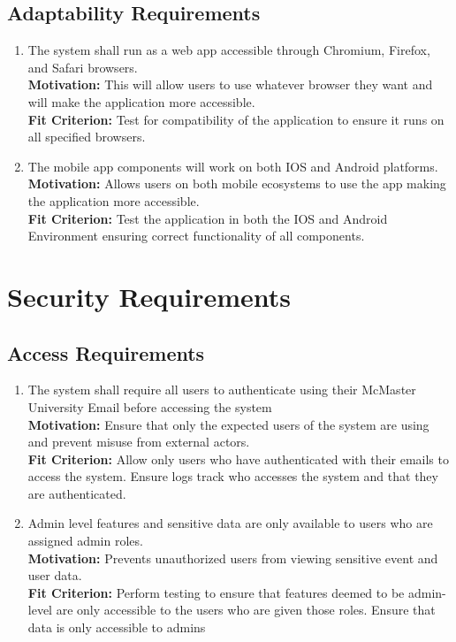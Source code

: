 \documentclass[12pt]{article}
\begin{document}
\subsection{Adaptability Requirements}
\begin{enumerate}[align=left,
  leftmargin=*,
  labelsep=1em,
  itemindent=0em,
  label=\bfseries AD-\arabic*:,
  ref=\bfseries AD-\arabic*]
  \item \label{MSAR1} The system shall run as a web app accessible through Chromium, Firefox, and Safari browsers. \\[2mm]
    {\bf Motivation:} This will allow users to use whatever browser they want and will make the application more accessible. \\
    {\bf Fit Criterion:} Test for compatibility of the application to ensure it runs on all specified browsers.
  \item \label{MSAR2} The mobile app components will work on both IOS and Android platforms. \\[2mm]
    {\bf Motivation:} Allows users on both mobile ecosystems to use the app making the application more accessible. \\
    {\bf Fit Criterion:} Test the application in both the IOS and Android Environment ensuring correct functionality of all components.
\end{enumerate}

\section{Security Requirements}
\subsection{Access Requirements}
\begin{enumerate}[align=left,
  leftmargin=*,
  labelsep=1em,
  itemindent=0em,
  label=\bfseries AC-\arabic*:,
  ref=\bfseries AC-\arabic*]
  \item \label{SAR1} The system shall require all users to authenticate using their McMaster University Email before accessing the system \\[2mm]
    {\bf Motivation:} Ensure that only the expected users of the system are using and prevent misuse from external actors.  \\
    {\bf Fit Criterion:} Allow only users who have authenticated with their emails to access the system. Ensure logs track who accesses the system and that they are authenticated.
  \item \label{SAR2} Admin level features and sensitive data are only available to users who are assigned admin roles. \\ [2mm]
    {\bf Motivation:} Prevents unauthorized users from viewing sensitive event and user data.  \\
    {\bf Fit Criterion:} Perform testing to ensure that features deemed to be admin-level are only accessible to the users who are given those roles. Ensure that data is only accessible to admins
\end{enumerate}
\end{document}
